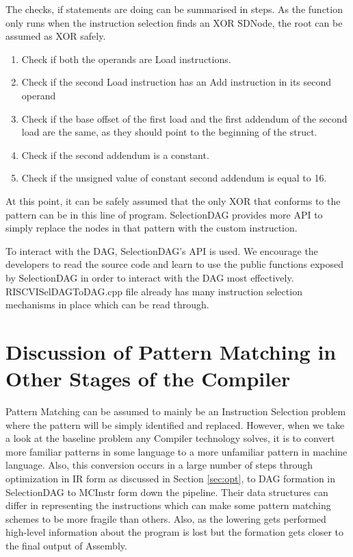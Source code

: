 The checks, if statements are doing can be summarised in steps. As the function only runs when the instruction selection finds an XOR SDNode, the root can be assumed as XOR safely.
\begin{enumerate}
    \item Check if both the operands are Load instructions.
    \item Check if the second Load instruction has an Add instruction in its second operand
    \item Check if the base offset of the first load and the first addendum of the second load are the same, as they should point to the beginning of the struct.
    \item Check if the second addendum is a constant.
    \item Check if the unsigned value of constant second addendum is equal to 16.
\end{enumerate}

At this point, it can be safely assumed that the only XOR that conforms to the pattern can be in this line of program. SelectionDAG provides more API to simply replace the nodes in that pattern with the custom instruction.


To interact with the DAG, SelectionDAG's API is used. We encourage the developers to read the source code and learn to use the public functions exposed by SelectionDAG in order to interact with the DAG most effectively. RISCVISelDAGToDAG.cpp file already has many instruction selection mechanisms in place which can be read through. 

\section{Discussion of Pattern Matching in Other Stages of the Compiler}\label{sec:patmatchdisc}
Pattern Matching can be assumed to mainly be an Instruction Selection problem where the pattern will be simply identified and replaced. However, when we take a look at the baseline problem any Compiler technology solves, it is to convert more familiar patterns in some language to a more unfamiliar pattern in machine language. Also, this conversion occurs in a large number of steps through optimization in IR form as discussed in Section \ref{sec:opt}, to DAG formation in SelectionDAG to MCInstr form down the pipeline. Their data structures can differ in representing the instructions which can make some pattern matching schemes to be more fragile than others. Also, as the lowering gets performed high-level information about the program is lost but the formation gets closer to the final output of Assembly. 

